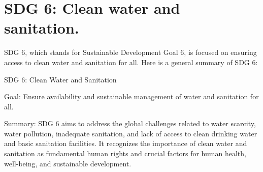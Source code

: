 \documentclass{article}
\begin{document}
\section*{SDG 6: Clean water and sanitation.}
SDG 6, which stands for Sustainable Development Goal 6, is focused on ensuring access to clean water and sanitation for all. Here is a general summary of SDG 6:

SDG 6: Clean Water and Sanitation

Goal: Ensure availability and sustainable management of water and sanitation for all.

Summary:
SDG 6 aims to address the global challenges related to water scarcity, water pollution, inadequate sanitation, and lack of access to clean drinking water and basic sanitation facilities. It recognizes the importance of clean water and sanitation as fundamental human rights and crucial factors for human health, well-being, and sustainable development.
\end{document}
